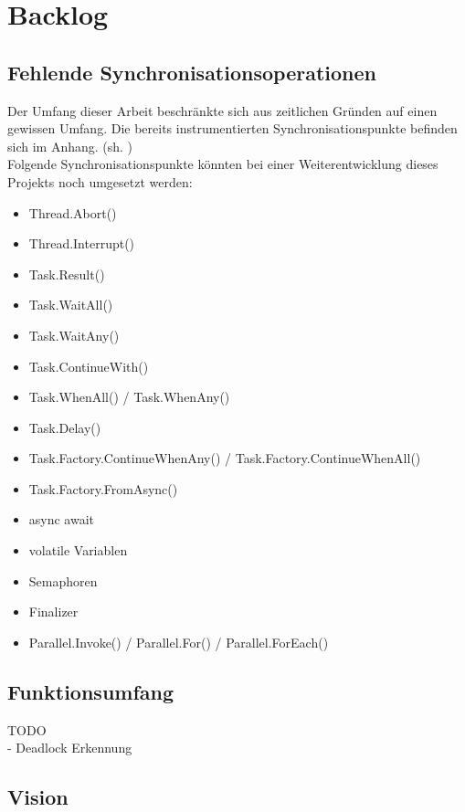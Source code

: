 \documentclass[10pt,a4paper]{article}
\begin{document}
\section{Backlog}
\subsection{Fehlende Synchronisationsoperationen}
\begin{flushleft}
Der Umfang dieser Arbeit beschränkte sich aus zeitlichen Gründen auf einen gewissen Umfang. Die bereits instrumentierten Synchronisationspunkte befinden sich im Anhang. (sh. )\\
Folgende Synchronisationspunkte könnten bei einer Weiterentwicklung dieses Projekts noch umgesetzt werden:
\begin{itemize}
\setlength\itemsep{0em}
\item Thread.Abort()
\item Thread.Interrupt()
\item Task.Result()
\item Task.WaitAll()
\item Task.WaitAny()
\item Task.ContinueWith()
\item Task.WhenAll() / Task.WhenAny()
\item Task.Delay()
\item Task.Factory.ContinueWhenAny() / Task.Factory.ContinueWhenAll()
\item Task.Factory.FromAsync()
\item async await
\item volatile Variablen
\item Semaphoren
\item Finalizer
\item Parallel.Invoke() / Parallel.For() / Parallel.ForEach()
\end{itemize}
\end{flushleft}
\subsection{Funktionsumfang}
TODO\\
- Deadlock Erkennung
\subsection{Vision}
\end{document}
